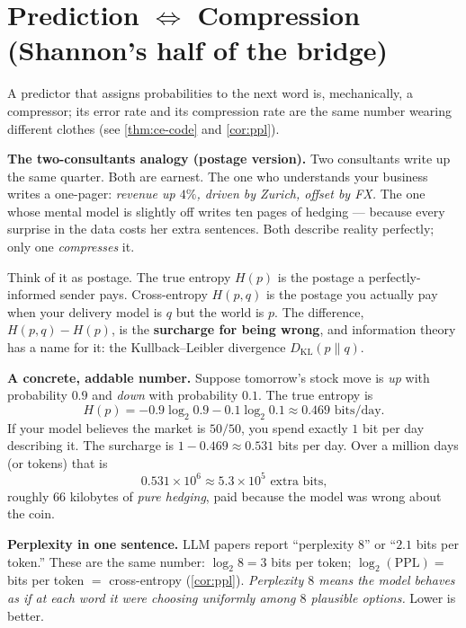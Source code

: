 \documentclass[12pt,a4paper]{article}
\theoremstyle{plain}
\theoremstyle{definition}
\begin{document}


\section{Prediction \texorpdfstring{$\Leftrightarrow$}{<=>} Compression
         (Shannon's half of the bridge)}
\label{sec:pred-comp}

\begin{intuition}
A predictor that assigns probabilities to the next word is, mechanically,
a compressor; its error rate and its compression rate are the same
number wearing different clothes (see \cref{thm:ce-code} and
\cref{cor:ppl}).

\medskip
\textbf{The two-consultants analogy (postage version).}  Two
consultants write up the same quarter.  Both are earnest.  The one
who understands your business writes a one-pager: \emph{revenue up
$4\%$, driven by Zurich, offset by FX.}  The one whose mental model
is slightly off writes ten pages of hedging --- because every
surprise in the data costs her extra sentences.  Both describe
reality perfectly; only one \emph{compresses} it.

Think of it as postage.  The true entropy $H(p)$ is the postage a
perfectly-informed sender pays.  Cross-entropy $H(p,q)$ is the
postage you actually pay when your delivery model is $q$ but the
world is $p$.  The difference, $H(p,q) - H(p)$, is the
\textbf{surcharge for being wrong}, and information theory has a
name for it: the Kullback--Leibler divergence $D_{\mathrm{KL}}(p\|q)$.

\medskip
\textbf{A concrete, addable number.}  Suppose tomorrow's stock move
is \emph{up} with probability $0.9$ and \emph{down} with probability
$0.1$.  The true entropy is
\[
 H(p) = -0.9\log_2 0.9 - 0.1\log_2 0.1 \approx 0.469 \text{ bits/day.}
\]
If your model believes the market is $50/50$, you spend exactly $1$
bit per day describing it.  The surcharge is
$1 - 0.469 \approx 0.531$ bits per day.  Over a million days (or
tokens) that is
\[
  0.531 \times 10^{6} \approx 5.3 \times 10^{5} \text{ extra bits,}
\]
roughly $66$ kilobytes of \emph{pure hedging}, paid because the model
was wrong about the coin.

\medskip
\textbf{Perplexity in one sentence.}  LLM papers report ``perplexity
$8$'' or ``$2.1$ bits per token.''  These are the same number:
$\log_2 8 = 3$ bits per token; $\log_2(\mathrm{PPL}) =$ bits per
token $=$ cross-entropy (\cref{cor:ppl}).  \emph{Perplexity $8$
means the model behaves as if at each word it were choosing
uniformly among $8$ plausible options.}  Lower is better.


\end{intuition}
\end{document}
